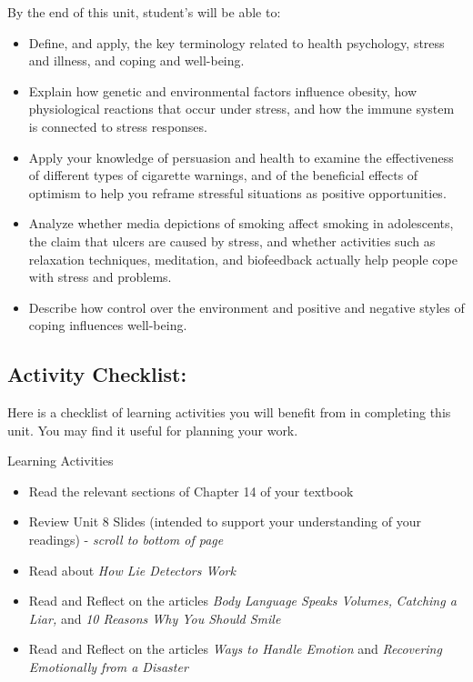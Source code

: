 \documentclass[
]{book}
\providecommand{\tightlist}{%
  \setlength{\itemsep}{0pt}\setlength{\parskip}{0pt}}
\begin{document}
By the end of this unit, student's will be able to:

\begin{itemize}
\tightlist
\item
  Define, and apply, the key terminology related to health psychology, stress and illness, and coping and well-being.\\
\item
  Explain how genetic and environmental factors influence obesity, how physiological reactions that occur under stress, and how the immune system is connected to stress responses.\\
\item
  Apply your knowledge of persuasion and health to examine the effectiveness of different types of cigarette warnings, and of the beneficial effects of optimism to help you reframe stressful situations as positive opportunities.\\
\item
  Analyze whether media depictions of smoking affect smoking in adolescents, the claim that ulcers are caused by stress, and whether activities such as relaxation techniques, meditation, and biofeedback actually help people cope with stress and problems.\\
\item
  Describe how control over the environment and positive and negative styles of coping influences well-being.
\end{itemize}

\hypertarget{activity-checklist-7}{%
\subsection*{Activity Checklist:}\label{activity-checklist-7}}

Here is a checklist of learning activities you will benefit from in completing this unit. You may find it useful for planning your work.

\begin{reflect}
{Learning Activities}

\begin{itemize}
\tightlist
\item
  Read the relevant sections of Chapter 14 of your textbook
\item
  Review Unit 8 Slides (intended to support your understanding of your readings) - \emph{scroll to bottom of page}
\item
  Read about \emph{How Lie Detectors Work}\\
\item
  Read and Reflect on the articles \emph{Body Language Speaks Volumes,} \emph{Catching a Liar,} and \emph{10 Reasons Why You Should Smile}
\item
  Read and Reflect on the articles \emph{Ways to Handle Emotion} and \emph{Recovering Emotionally from a Disaster}
\end{itemize}
\end{reflect}
\end{document}

